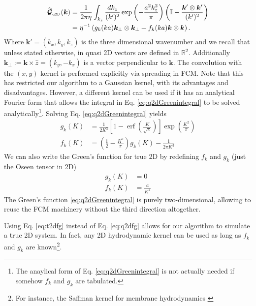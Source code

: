 \documentclass[ twoside,openright,titlepage,numbers=noenddot,%
headinclude,footinclude,cleardoublepage=empty,abstract=on,
BCOR=5mm,paper=b5,fontsize=11pt, dvipsnames
]{scrreprt}
\renewcommand{\vec}[1]{\bm{#1}}
\newcommand{\tens}[1]{\bm{\mathcal{#1}}}
\newcommand{\fou}[1]{\widehat{#1}}
\DeclareMathOperator{\erf}{erf}
\newcommand{\qtd}{\text{\tiny q2D}}
\begin{document}
\begin{equation}
  \label{eq:q2dGreenintegral}
  \begin{aligned}
  \fou{\tens{G}}_{\qtd}(\vec{k}) &= \frac{1}{2\pi\eta}\int_{k_z} \frac{dk_z}{(k')^2}\exp\left(-\frac{a^2k_z^2}{\pi}\right)\left( \mathbb{I} - \frac{\vec{k}'\otimes\vec{k}'}{(k')^2}\right) \\
  &= \eta^{-1}\left(g_k(ka)\vec{k}_{\perp}\otimes\vec{k}_{\perp} + f_k(ka)\vec{k}\otimes\vec{k}\right).
\end{aligned}
\end{equation}
Where $\vec{k}' = (k_x, k_y, k_z)$ is the three dimensional wavenumber and we recall that unless stated otherwise, in quasi 2D vectors are defined in $\mathbb{R}^2$. Additionally $\vec{k}_\perp := \vec{k}\times\hat{z} = (k_y, -k_x)$ is a vector perpendicular to $\vec{k}$.
The convolution with the $(x,y)$ kernel is performed explicitly via spreading in \gls{FCM}.
Note that this has restricted our algorithm to a Gaussian kernel, with its advantages and disadvantages. However, a different kernel can be used if it has an analytical Fourier form that allows the integral in Eq. \eqref{eq:q2dGreenintegral} to be solved analytically\footnote{The anaylical form of Eq. \eqref{eq:q2dGreenintegral} is not actually needed if somehow $f_k$ and $g_k$ are tabulated.}.
Solving Eq. \eqref{eq:q2dGreenintegral} yields
\begin{equation}
  \label{eq:q2dfg}
  \begin{aligned}
    g_{k}\left(K\right) & = \frac{1}{2K^3}\left[1-{\erf}\left(\frac{K}{\sqrt{\pi}}\right)\right]\exp\left(\frac{K^2}{\pi}\right)\\
    f_{k}\left(K\right) & = \left(\frac{1}{2} - \frac{K^{2}}{\pi}\right)g_k(K) - \frac{1}{2\pi K^3}
  \end{aligned}  
\end{equation}
We can also write the Green's function for true 2D by redefining $f_k$ and $g_k$ (just the Oseen tensor in 2D)
\begin{equation}
  \label{eq:t2dfg}
  \begin{aligned}
    g_{k}\left(K\right) & = 0\\
    f_{k}\left(K\right) & = \frac{a}{K^4}
  \end{aligned}  
\end{equation}
The Green's function \eqref{eq:q2dGreenintegral} is purely two-dimensional, allowing to reuse the \gls{FCM} machinery without the third direction altogether.

Using Eq. \eqref{eq:t2dfg} instead of Eq. \eqref{eq:q2dfg} allows for our algorithm to simulate a true 2D system. In fact, any 2D hydrodynamic kernel can be used as long as $f_k$ and $g_k$ are known\footnote{For instance, the Saffman kernel for membrane hydrodynamics \cite{Brown20112.}}.
\end{document}
